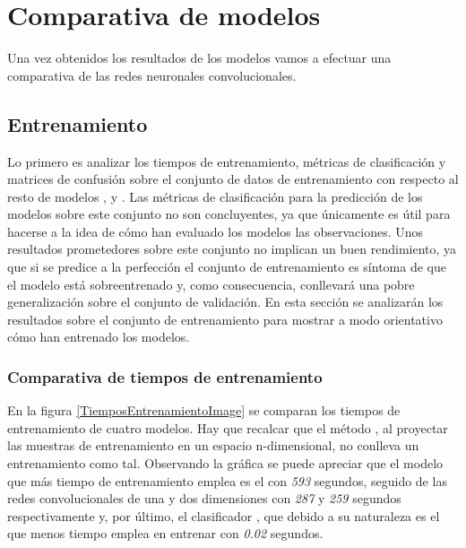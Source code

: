 

\section{Comparativa de modelos}


  Una vez obtenidos los resultados de los modelos vamos a efectuar una comparativa de las redes neuronales convolucionales. 

  \subsection{Entrenamiento}

  Lo primero es analizar los tiempos de entrenamiento, métricas de clasificación y matrices de confusión sobre el conjunto de datos de entrenamiento con respecto al resto de modelos  ,  y . Las métricas de clasificación para la predicción de los modelos sobre este conjunto no son concluyentes, ya que únicamente es útil para hacerse a la idea de cómo han evaluado los modelos las observaciones. Unos resultados prometedores sobre este conjunto no implican un buen rendimiento, ya que si se predice a la perfección el conjunto de entrenamiento es síntoma de que el modelo está sobreentrenado y, como consecuencia, conllevará una pobre generalización sobre el conjunto de validación. En esta sección se analizarán los resultados sobre el conjunto de entrenamiento para mostrar a modo orientativo cómo han entrenado los modelos.

  \subsubsection{Comparativa de tiempos de entrenamiento}

    En la figura \eqref{TiemposEntrenamientoImage} se comparan los tiempos de entrenamiento de cuatro modelos. Hay que recalcar que el método , al proyectar las muestras de entrenamiento en un espacio n-dimensional, no conlleva un entrenamiento como tal. Observando la gráfica se puede apreciar que el modelo que más tiempo de entrenamiento emplea es el  con \textit{593} segundos, seguido de las redes convolucionales de una y dos dimensiones con \textit{287} y \textit{259} segundos respectivamente y, por último, el clasificador , que debido a su naturaleza es el que menos tiempo emplea en entrenar con \textit{0.02} segundos.

